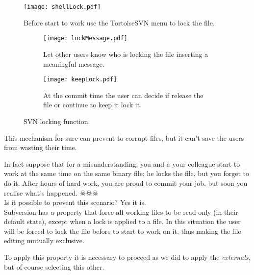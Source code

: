 \begin{figure}[htbp]
    \centering
    \texttt{[image: shellLock.pdf]}
    \caption{Before start to work use the TortoiseSVN menu to lock the file.}
    \label{fig:shellLock}
\end{figure}



\begin{figure}[htbp]
\begin{subfigure}{0.5\textwidth}
  \centering
  \texttt{[image: lockMessage.pdf]}
  \caption{Let other users know who is locking the file inserting a meaningful message.}
  \label{fig:lockMessage}
\end{subfigure}%
\hspace{5mm}
\begin{subfigure}{0.5\textwidth}
  \centering
  \texttt{[image: keepLock.pdf]}
  \caption{At the commit time the user can decide if release the file or continue to keep it lock it.}
  \label{fig:keepLock}
\end{subfigure}
\caption{SVN locking function.}
\label{fig:svnLocks}
\end{figure}



This mechanism for sure can prevent to corrupt files, but it can't save the users from wasting their time.\newline

In fact suppose that for a misunderstanding, you and a your colleague start to work at the same time on the same binary file; he locks the file, but you forget to do it. After hours of hard work, you are proud to commit your job, but soon you realise what's happened. $\skull \skull \skull$\\

Is it possible to prevent this scenario? Yes it is.\\

Subversion has a property that force all working files to be read only (in their default state), except when a lock is applied to a file. In this situation the user will be forced to lock the file before to start to work on it, thus making the file editing mutually exclusive.\newline

To apply this property it is necessary to proceed as we did to apply the \textit{externals}, but of course selecting this other.

